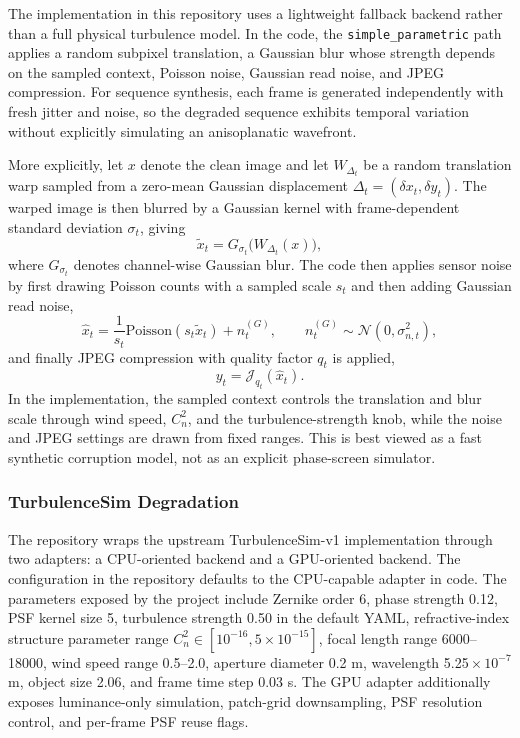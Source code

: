 \documentclass{article}
\begin{document}
The implementation in this repository uses a lightweight fallback backend rather than a full physical turbulence model. In the code, the \texttt{simple\_parametric} path applies a random subpixel translation, a Gaussian blur whose strength depends on the sampled context, Poisson noise, Gaussian read noise, and JPEG compression. For sequence synthesis, each frame is generated independently with fresh jitter and noise, so the degraded sequence exhibits temporal variation without explicitly simulating an anisoplanatic wavefront.

More explicitly, let $x$ denote the clean image and let $W_{\Delta_t}$ be a random translation warp sampled from a zero-mean Gaussian displacement $\Delta_t=(\delta x_t,\delta y_t)$. The warped image is then blurred by a Gaussian kernel with frame-dependent standard deviation $\sigma_t$, giving
\begin{equation}
\tilde{x}_t = G_{\sigma_t}\!\bigl(W_{\Delta_t}(x)\bigr),
\end{equation}
where $G_{\sigma_t}$ denotes channel-wise Gaussian blur. The code then applies sensor noise by first drawing Poisson counts with a sampled scale $s_t$ and then adding Gaussian read noise,
\begin{equation}
\hat{x}_t = \frac{1}{s_t} \mathrm{Poisson}(s_t\tilde{x}_t) + n_t^{(G)}, \qquad n_t^{(G)} \sim \mathcal{N}(0,\sigma_{n,t}^2),
\end{equation}
and finally JPEG compression with quality factor $q_t$ is applied,
\begin{equation}
y_t = \mathcal{J}_{q_t}(\hat{x}_t).
\end{equation}
In the implementation, the sampled context controls the translation and blur scale through wind speed, $C_n^2$, and the turbulence-strength knob, while the noise and JPEG settings are drawn from fixed ranges. This is best viewed as a fast synthetic corruption model, not as an explicit phase-screen simulator.

\subsubsection{TurbulenceSim Degradation}

The repository wraps the upstream TurbulenceSim-v1 implementation through two adapters: a CPU-oriented backend and a GPU-oriented backend. The configuration in the repository defaults to the CPU-capable adapter in code. The parameters exposed by the project include Zernike order 6, phase strength 0.12, PSF kernel size 5, turbulence strength 0.50 in the default YAML, refractive-index structure parameter range $C_n^2 \in [10^{-16}, 5\times10^{-15}]$, focal length range 6000--18000, wind speed range 0.5--2.0, aperture diameter 0.2 m, wavelength 5.25\,$\times$\,$10^{-7}$ m, object size 2.06, and frame time step 0.03 s. The GPU adapter additionally exposes luminance-only simulation, patch-grid downsampling, PSF resolution control, and per-frame PSF reuse flags.
\end{document}
